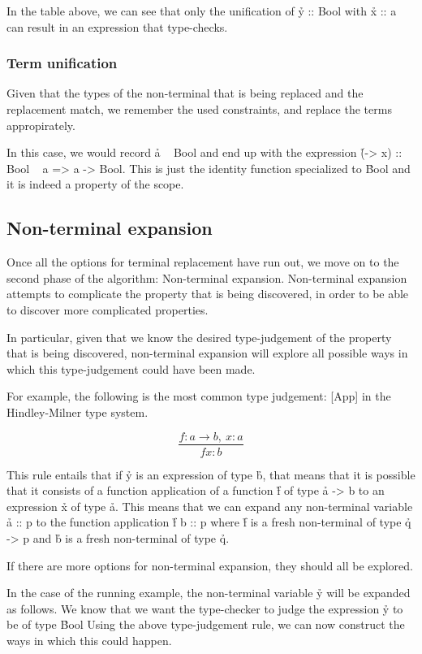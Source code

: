 \documentclass[a4paper, 11pt]{article}
\begin{document}
In the table above, we can see that only the unification of \h{y :: Bool} with \h{x :: a} can result in an expression that type-checks.

\subsubsection{Term unification}

Given that the types of the non-terminal that is being replaced and the replacement match, we remember the used constraints, and replace the terms appropirately.

In this case, we would record \h{a ~ Bool} and end up with the expression \h{(\x -> x) :: Bool ~ a => a -> Bool}.
This is just the identity function specialized to \h{Bool} and it is indeed a property of the scope.

\subsection{Non-terminal expansion}

Once all the options for terminal replacement have run out, we move on to the second phase of the algorithm: Non-terminal expansion.
Non-terminal expansion attempts to complicate the property that is being discovered, in order to be able to discover more complicated properties. 

In particular, given that we know the desired type-judgement of the property that is being discovered,
non-terminal expansion will explore all possible ways in which this type-judgement could have been made.

For example, the following is the most common type judgement:
[App] in the Hindley-Milner type system. 

\[
  \frac{f : a \rightarrow b,\ x : a}{f x : b}
\]

This rule entails that if \h{y} is an expression of type \h{b}, that means that it is possible that it consists of a function application of a function \h{f} of type \h{a -> b} to an expression \h{x} of type \h{a}.
This means that we can expand any non-terminal variable \h{a :: p} to the function application \h{f b :: p} where \h{f} is a fresh non-terminal of type \h{q -> p} and \h{b} is a fresh non-terminal of type \h{q}.

If there are more options for non-terminal expansion, they should all be explored.

In the case of the running example, the non-terminal variable \h{y} will be expanded as follows.
We know that we want the type-checker to judge the expression \h{y} to be of type \h{Bool}
Using the above type-judgement rule, we can now construct the ways in which this could happen.
\end{document}

